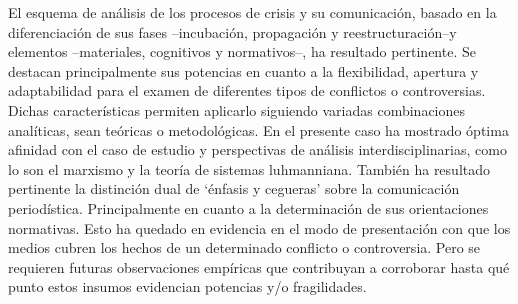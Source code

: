 \documentclass{textolivre}
\begin{document}
El esquema de análisis de los procesos de crisis y su comunicación, basado en la
diferenciación de sus fases --incubación, propagación y reestructuración--y elementos
--materiales, cognitivos y normativos--, ha resultado pertinente. Se destacan
principalmente sus potencias en cuanto a la flexibilidad, apertura y adaptabilidad para el
examen de diferentes tipos de conflictos o controversias. Dichas características permiten
aplicarlo siguiendo variadas combinaciones analíticas, sean teóricas o metodológicas. En
el presente caso ha mostrado óptima afinidad con el caso de estudio y perspectivas de
análisis interdisciplinarias, como lo son el marxismo y la teoría de sistemas luhmanniana.
También ha resultado pertinente la distinción dual de ‘énfasis y cegueras’ sobre la
comunicación periodística. Principalmente en cuanto a la determinación de sus
orientaciones normativas. Esto ha quedado en evidencia en el modo de presentación con
que los medios cubren los hechos de un determinado conflicto o controversia. Pero se
requieren futuras observaciones empíricas que contribuyan a corroborar hasta qué punto
estos insumos evidencian potencias y/o fragilidades.




\printbibliography\label{sec-bib}
\end{document}
